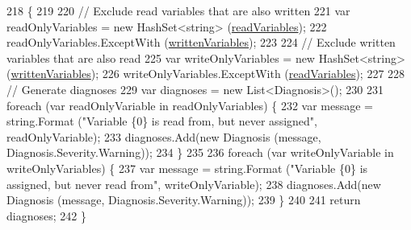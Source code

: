 \begin{DoxyCode}
218         \{
219 
220             \textcolor{comment}{// Exclude read variables that are also written}
221             var readOnlyVariables = \textcolor{keyword}{new} HashSet<string> (\hyperlink{a00161_a6b542092ddce1b92c9455d60899518a9}{readVariables});
222             readOnlyVariables.ExceptWith (\hyperlink{a00161_a0c2fe6eded1b10b135ca2469f5980a39}{writtenVariables});
223 
224             \textcolor{comment}{// Exclude written variables that are also read}
225             var writeOnlyVariables = \textcolor{keyword}{new} HashSet<string> (\hyperlink{a00161_a0c2fe6eded1b10b135ca2469f5980a39}{writtenVariables});
226             writeOnlyVariables.ExceptWith (\hyperlink{a00161_a6b542092ddce1b92c9455d60899518a9}{readVariables});
227 
228             \textcolor{comment}{// Generate diagnoses}
229             var diagnoses = \textcolor{keyword}{new} List<Diagnosis>();
230 
231             \textcolor{keywordflow}{foreach} (var readOnlyVariable \textcolor{keywordflow}{in} readOnlyVariables) \{
232                 var message = string.Format (\textcolor{stringliteral}{"Variable \{0\} is read from, but never assigned"}, 
      readOnlyVariable);
233                 diagnoses.Add(\textcolor{keyword}{new} Diagnosis (message, Diagnosis.Severity.Warning));
234             \}
235 
236             \textcolor{keywordflow}{foreach} (var writeOnlyVariable \textcolor{keywordflow}{in} writeOnlyVariables) \{
237                 var message = string.Format (\textcolor{stringliteral}{"Variable \{0\} is assigned, but never read from"}, 
      writeOnlyVariable);
238                 diagnoses.Add(\textcolor{keyword}{new} Diagnosis (message, Diagnosis.Severity.Warning));
239             \}
240 
241             \textcolor{keywordflow}{return} diagnoses;
242         \}
\end{DoxyCode}


